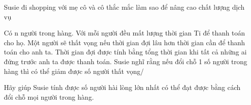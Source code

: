 Susie đi shopping với mẹ cô và cô thắc mắc làm sao để nâng cao chất lượng dịch vụ

Có n người trong hàng. Với mỗi người đều mất lượng thời gian Ti để thanh toán cho họ. Một người sẽ thất vọng nếu thời gian đợi lâu hơn thời gian cần để thanh toán cho anh ta. Thời gian đợi được tính bằng tổng thời gian khi tất cả những ai đứng trước anh ta được thanh toán. Susie nghĩ rằng nếu đổi chỗ 1 số người trong hàng thì có thể giảm được số người thất vọng/

Hãy giúp Susie tính được số người hài lòng lớn nhất có thể đạt được bằng cách đổi chỗ mọi người trong hàng.